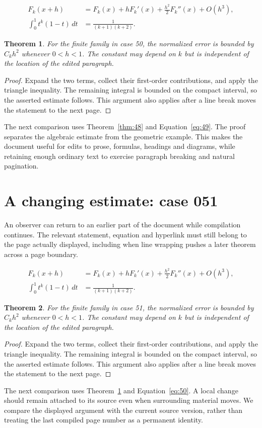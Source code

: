 \documentclass[a4paper,10pt]{article}
\newtheorem{theorem}{Theorem}[section]
\begin{document}
\lipsum[28-29]
\begin{align}\label{eq:49}
 F_k(x+h)&=F_k(x)+hF_k'(x)+\frac{h^2}{2}F_k''(x)+O(h^3),\\
 \int_0^1 t^k(1-t)\,dt&=\frac{1}{(k+1)(k+2)}.
\end{align}
\begin{theorem}\label{thm:49}
For the finite family in case 50, the normalized error is bounded by $C_k h^2$ whenever $0<h<1$. The constant may depend on $k$ but is independent of the location of the edited paragraph.
\end{theorem}
\begin{proof}
Expand the two terms, collect their first-order contributions, and apply the
triangle inequality. The remaining integral is bounded on the compact interval,
so the asserted estimate follows. This argument also applies after a line break
moves the statement to the next page.
\end{proof}
The next comparison uses Theorem~\ref{thm:48} and Equation~\ref{eq:49}. The proof separates the algebraic estimate from the geometric example. This makes the document useful for edits to prose, formulas, headings and diagrams, while retaining enough ordinary text to exercise paragraph breaking and natural pagination.

\lipsum[23]

\section{A changing estimate: case 051}\label{unit:50}
An observer can return to an earlier part of the document while compilation continues. The relevant statement, equation and hyperlink must still belong to the page actually displayed, including when line wrapping pushes a later theorem across a page boundary.

\lipsum[1-2]
\begin{align}\label{eq:50}
 F_k(x+h)&=F_k(x)+hF_k'(x)+\frac{h^2}{2}F_k''(x)+O(h^3),\\
 \int_0^1 t^k(1-t)\,dt&=\frac{1}{(k+1)(k+2)}.
\end{align}
\begin{theorem}\label{thm:50}
For the finite family in case 51, the normalized error is bounded by $C_k h^2$ whenever $0<h<1$. The constant may depend on $k$ but is independent of the location of the edited paragraph.
\end{theorem}
\begin{proof}
Expand the two terms, collect their first-order contributions, and apply the
triangle inequality. The remaining integral is bounded on the compact interval,
so the asserted estimate follows. This argument also applies after a line break
moves the statement to the next page.
\end{proof}
The next comparison uses Theorem~\ref{thm:49} and Equation~\ref{eq:50}. A local change should remain attached to its source even when surrounding material moves. We compare the displayed argument with the current source version, rather than treating the last compiled page number as a permanent identity.
\end{document}
